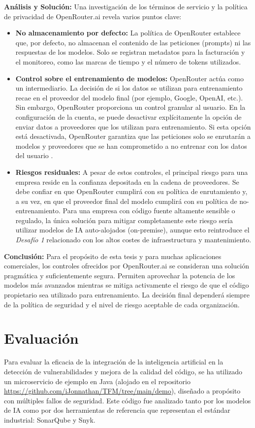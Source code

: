 \textbf{Análisis y Solución:} Una investigación de los términos de servicio y la política de privacidad de OpenRouter.ai \cite{OpenRouterTOS} revela varios puntos clave:
\begin{itemize}
    \item \textbf{No almacenamiento por defecto:} La política de OpenRouter establece que, por defecto, no almacenan el contenido de las peticiones (prompts) ni las respuestas de los modelos. Solo se registran metadatos para la facturación y el monitoreo, como las marcas de tiempo y el número de tokens utilizados.
    \item \textbf{Control sobre el entrenamiento de modelos:} OpenRouter actúa como un intermediario. La decisión de si los datos se utilizan para entrenamiento recae en el proveedor del modelo final (por ejemplo, Google, OpenAI, etc.). Sin embargo, OpenRouter proporciona un control granular al usuario. En la configuración de la cuenta, se puede desactivar explícitamente la opción de enviar datos a proveedores que los utilizan para entrenamiento. Si esta opción está desactivada, OpenRouter garantiza que las peticiones solo se enrutarán a modelos y proveedores que se han comprometido a no entrenar con los datos del usuario \cite{OpenRouterPrivacy}.
    \item \textbf{Riesgos residuales:} A pesar de estos controles, el principal riesgo para una empresa reside en la confianza depositada en la cadena de proveedores. Se debe confiar en que OpenRouter cumplirá con su política de enrutamiento y, a su vez, en que el proveedor final del modelo cumplirá con su política de no-entrenamiento. Para una empresa con código fuente altamente sensible o regulado, la única solución para mitigar completamente este riesgo sería utilizar modelos de IA auto-alojados (on-premise), aunque esto reintroduce el \textit{Desafío 1} relacionado con los altos costes de infraestructura y mantenimiento.
\end{itemize}

\textbf{Conclusión:} Para el propósito de esta tesis y para muchas aplicaciones comerciales, los controles ofrecidos por OpenRouter.ai se consideran una solución pragmática y suficientemente segura. Permiten aprovechar la potencia de los modelos más avanzados mientras se mitiga activamente el riesgo de que el código propietario sea utilizado para entrenamiento. La decisión final dependerá siempre de la política de seguridad y el nivel de riesgo aceptable de cada organización.


\section{Evaluación}
\label{sec:evaluacion}
Para evaluar la eficacia de la integración de la inteligencia artificial en la detección de vulnerabilidades y mejora de la calidad del código, se ha utilizado un microservicio de ejemplo en Java (alojado en el repositorio \url{https://github.com/iJonnathan/TFM/tree/main/demo}), diseñado a propósito con múltiples fallos de seguridad. Este código fue analizado tanto por los modelos de IA como por dos herramientas de referencia que representan el estándar industrial: SonarQube y Snyk.


